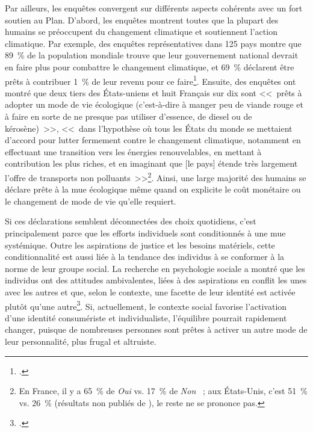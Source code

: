 \documentclass[a5paper,french,openany]{memoir}
\begin{document}
Par ailleurs, les enquêtes convergent sur différents aspects cohérents avec un fort soutien au Plan. D'abord, les enquêtes montrent toutes que la plupart des humains se préoccupent du changement climatique et soutiennent l'action climatique. Par exemple, des enquêtes représentatives dans 125 pays montre que 89~\% de la population mondiale trouve que leur gouvernement national devrait en faire plus pour combattre le changement climatique, et 69~\% déclarent être prêts à contribuer 1~\% de leur revenu pour ce faire\footnote{\cite{andre_globally_2024}.}. %
Ensuite, des enquêtes ont montré que deux tiers des États-uniens et huit Français sur dix sont <<~prêts à adopter un mode de vie écologique (c'est-à-dire à manger peu de viande rouge et à faire en sorte de ne presque pas utiliser d'essence, de diesel ou de
kérosène)~>>, <<~dans l'hypothèse où tous les États du monde se mettaient d'accord pour lutter fermement contre le changement climatique, notamment en effectuant une
transition vers les énergies renouvelables, en mettant à contribution les plus riches, et en imaginant que [le pays] étende très largement l'offre de transports non polluants~>>\footnote{En France, il y a 65~\% de \textit{Oui} vs. 17~\% de \textit{Non} \citep{douenne_french_2020}~; aux États-Unis, c'est 51~\% vs. 26~\% (résultats non publiés de \citealp{dechezlepretre_fighting_2022}), le reste ne se prononce pas.}. %
Ainsi, une large majorité des humains se déclare prête à la mue écologique même quand on explicite le coût monétaire ou le changement de mode de vie qu'elle requiert. 

Si ces déclarations semblent déconnectées des choix quotidiens, c'est principalement parce que les efforts individuels sont conditionnés à une mue systémique. Outre les aspirations de justice et les besoins matériels, cette conditionnalité est aussi liée à la tendance des individus à se conformer à la norme de leur groupe social. La recherche en psychologie sociale a montré que les individus ont des attitudes ambivalentes, liées à des aspirations en conflit les unes avec les autres et que, selon le contexte, une facette de leur identité est activée plutôt qu'une autre\footnote{\cite{fielding_social_2016}.}. %
Si, actuellement, le contexte social favorise l'activation d'une identité consumériste et individualiste, l'équilibre pourrait rapidement changer, puisque de nombreuses personnes sont prêtes à activer un autre mode de leur personnalité, plus frugal et altruiste.
\end{document}
